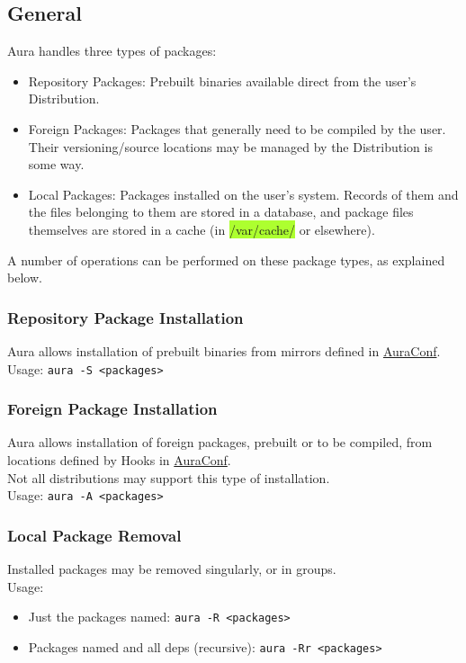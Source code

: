 \documentclass{article}
\begin{document}
\subsection{General}
Aura handles three types of packages:
\begin{itemize}
  \item Repository Packages: Prebuilt binaries available
    direct from the user's Distribution.
  \item Foreign Packages: Packages that generally need to be compiled
    by the user. Their versioning/source locations may be managed
    by the Distribution is some way.
  \item Local Packages: Packages installed on the user's system.
    Records of them and the files belonging to them are stored in a
    database, and package files themselves are stored in a cache
    (in \colorbox{GreenYellow}{/var/cache/} or elsewhere).
\end{itemize}
A number of operations can be performed on these package types,
as explained below.


\subsubsection{Repository Package Installation}
Aura allows installation of prebuilt binaries from mirrors
defined in \hyperref[auraconf]{AuraConf}.\\
Usage: \colorbox{Apricot}{\texttt{aura -S <packages>}}\\


\subsubsection{Foreign Package Installation}
Aura allows installation of foreign packages, prebuilt or to be
compiled, from locations defined by Hooks in \hyperref[auraconf]{AuraConf}.\\
Not all distributions may support this type of installation.\\
Usage: \colorbox{Apricot}{\texttt{aura -A <packages>}}


\subsubsection{Local Package Removal}
Installed packages may be removed singularly, or in groups.\\
Usage:
\begin{itemize}
  \item Just the packages named: \colorbox{Apricot}{\texttt{aura -R <packages>}}
  \item Packages named and all deps (recursive):
    \colorbox{Apricot}{\texttt{aura -Rr <packages>}}
\end{itemize}
\end{document}
